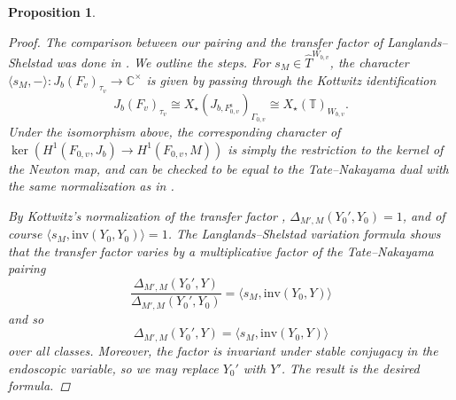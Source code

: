 \documentclass[openany]{amsbook}
\newtheorem{proposition}[theorem]{Proposition}
\theoremstyle{definition}
\theoremstyle{remark}
\numberwithin{equation}{section}
\newcommand{\C}{\mathbb{C}}
\newcommand{\T}{\mathbb{T}}
\renewcommand{\-}{\operatorname{-}}
\newcommand{\sep}{\text{s}}
\newcommand{\inv}{\mathrm{inv}}
\begin{document}
\begin{proposition}
\begin{proof}
        The comparison between our pairing and the transfer factor of Langlands--Shelstad was done in \cite[\S 1.5-1.11]{ngofl}. We outline the steps. For $s_M \in \widehat{T}^{W_{b,v}}$, the character $\langle s_M, - \rangle : J_b(F_v)_{\tau_v} \to \C^\times$ is given by passing through the Kottwitz identification 
        $$
            J_b(F_v)_{\tau_v} \cong X_\star(J_{b, F_{0,v}^{\sep}})_{\Gamma_{0,v}} \cong X_\star(\T)_{W_{b,v}}. 
        $$
        Under the isomorphism above, the corresponding character of $\ker(H^1(F_{0,v}, J_b) \to H^1(F_{0,v}, M))$ is simply the restriction to the kernel of the Newton map, and can be checked to be equal to the Tate--Nakayama dual with the same normalization as in \cite[\S 1.6, 1.9]{ngofl}.
        
        By Kottwitz's normalization of the transfer factor \cite{kottwitztransferliealg}, $\Delta_{M',M}(Y_0', Y_0) = 1$, and of course $\langle s_M, \inv(Y_0, Y_0) \rangle  = 1$. The Langlands--Shelstad variation formula \cite[cf.\ \S 3.4, \S 3.7]{lstransferfactors} shows that the transfer factor varies by a multiplicative factor of the Tate--Nakayama pairing
        $$
            \frac{\Delta_{M',M}(Y_0', Y)}{\Delta_{M',M}(Y_0', Y_0)} = \langle s_M, \inv(Y_0, Y)\rangle
        $$
        and so
        $$
            \Delta_{M',M}(Y_0', Y) = \langle s_M, \inv(Y_0, Y) \rangle
        $$
        over all classes.
        Moreover, the factor is invariant under stable conjugacy in the endoscopic variable, so we may replace $Y_0'$ with $Y'$. The result is the desired formula.
    \end{proof}
\end{proposition}
\end{document}
